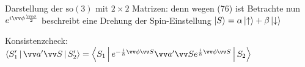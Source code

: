 \documentclass[a4paper]{scrartcl}
\begin{document}
{Darstellung der $\mathrm{so}(3)$ mit $2 \times 2$ Matrizen:
denn wegen (76) ist 
Betrachte nun
$e^{i \vv \phi \frac{ \vv \sigma}2}$ beschreibt eine Drehung der Spin-Einstellung $ \Ket S = \alpha \Ket \uparrow + \beta \Ket \downarrow$

Konsistenzcheck: $\Braket{ S_1' | \vv a' \vv S | S_2'} = \Braket{ S_1 | e^{- \frac i \hbar \vv \phi \vv S} \vv a' \vv S e^{\frac i \hbar \vv \phi \vv S} | S_2}$

}
\end{document}
